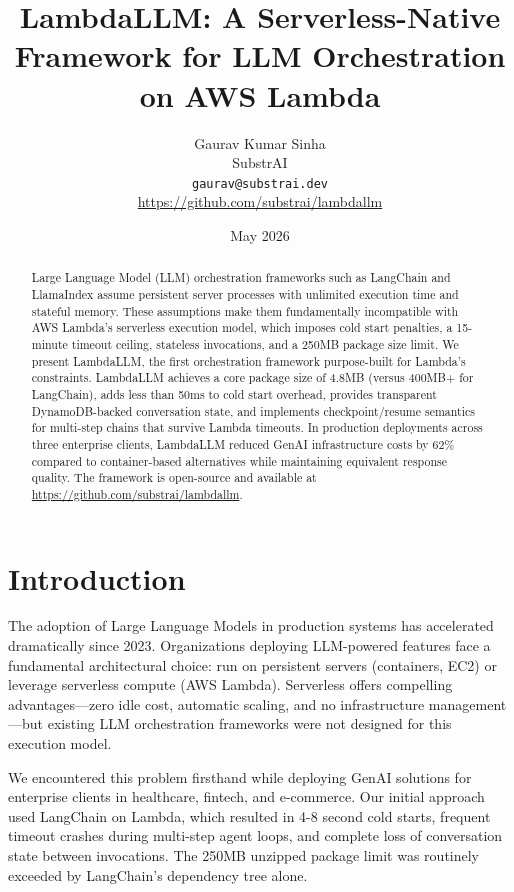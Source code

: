 \documentclass[11pt,a4paper]{article}
\title{LambdaLLM: A Serverless-Native Framework for LLM Orchestration on AWS Lambda}
\author{
Gaurav Kumar Sinha\\
SubstrAI\\
\texttt{gaurav@substrai.dev}\\
\url{https://github.com/substrai/lambdallm}
}
\date{May 2026}
\begin{document}
\maketitle

\begin{abstract}
Large Language Model (LLM) orchestration frameworks such as LangChain and LlamaIndex assume persistent server processes with unlimited execution time and stateful memory. These assumptions make them fundamentally incompatible with AWS Lambda's serverless execution model, which imposes cold start penalties, a 15-minute timeout ceiling, stateless invocations, and a 250MB package size limit. We present LambdaLLM, the first orchestration framework purpose-built for Lambda's constraints. LambdaLLM achieves a core package size of 4.8MB (versus 400MB+ for LangChain), adds less than 50ms to cold start overhead, provides transparent DynamoDB-backed conversation state, and implements checkpoint/resume semantics for multi-step chains that survive Lambda timeouts. In production deployments across three enterprise clients, LambdaLLM reduced GenAI infrastructure costs by 62\% compared to container-based alternatives while maintaining equivalent response quality. The framework is open-source and available at \url{https://github.com/substrai/lambdallm}.
\end{abstract}

\section{Introduction}

The adoption of Large Language Models in production systems has accelerated dramatically since 2023. Organizations deploying LLM-powered features face a fundamental architectural choice: run on persistent servers (containers, EC2) or leverage serverless compute (AWS Lambda). Serverless offers compelling advantages---zero idle cost, automatic scaling, and no infrastructure management---but existing LLM orchestration frameworks were not designed for this execution model.

We encountered this problem firsthand while deploying GenAI solutions for enterprise clients in healthcare, fintech, and e-commerce. Our initial approach used LangChain on Lambda, which resulted in 4-8 second cold starts, frequent timeout crashes during multi-step agent loops, and complete loss of conversation state between invocations. The 250MB unzipped package limit was routinely exceeded by LangChain's dependency tree alone.
\end{document}

